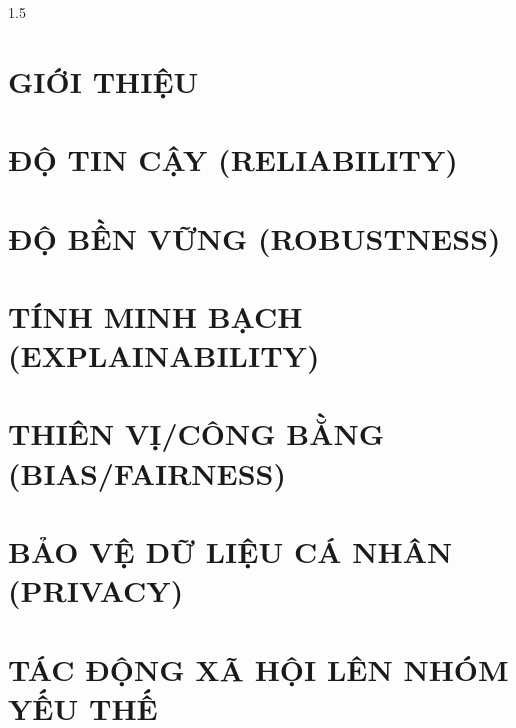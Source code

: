 \documentclass[10pt, a4paper]{report}
\begin{document}
\begin{spacing}{1.5}
\pagestyle{fancy}

\setcounter{tocdepth}{1}
\setcounter{secnumdepth}{2}
\large

\thispagestyle{empty}
\begin{justify}

\tableofcontents
\thispagestyle{empty}
\clearpage

\chapter{GIỚI THIỆU}
\setcounter{page}{1}


\chapter{ĐỘ TIN CẬY (RELIABILITY)}


\chapter{ĐỘ BỀN VỮNG (ROBUSTNESS)}


\chapter{TÍNH MINH BẠCH (EXPLAINABILITY)}


\chapter{THIÊN VỊ/CÔNG BẰNG (BIAS/FAIRNESS)}


\chapter{BẢO VỆ DỮ LIỆU CÁ NHÂN (PRIVACY)}


\chapter{TÁC ĐỘNG XÃ HỘI LÊN NHÓM YẾU THẾ}



\end{justify}
\end{spacing}
\end{document}
